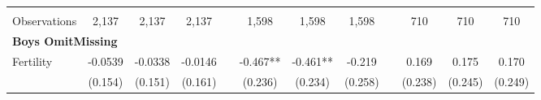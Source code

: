 \begin{landscape}
\begin{table}[htpb!]
\begin{center}
\begin{tabular}{lcccp{2mm}cccp{2mm}ccc}
\begin{footnotesize}\end{footnotesize}&\begin{footnotesize}\end{footnotesize}&\begin{footnotesize}\end{footnotesize}&\begin{footnotesize}\end{footnotesize}&\begin{footnotesize}\end{footnotesize}&\begin{footnotesize}\end{footnotesize}&\begin{footnotesize}\end{footnotesize}&\begin{footnotesize}\end{footnotesize}&\begin{footnotesize}\end{footnotesize}&\begin{footnotesize}\end{footnotesize}&\begin{footnotesize}\end{footnotesize}&\begin{footnotesize}\end{footnotesize}\\Observations&2,137&2,137&2,137&&1,598&1,598&1,598&&710&710&710\\
\multicolumn{12}{l}{\textbf{Boys OmitMissing}}\\ 
Fertility&-0.0539&-0.0338&-0.0146&&-0.467**&-0.461**&-0.219&&0.169&0.175&0.170\\
&(0.154)&(0.151)&(0.161)&&(0.236)&(0.234)&(0.258)&&(0.238)&(0.245)&(0.249)\\

\end{tabular}
\end{center}
\end{table}
\end{landscape}
